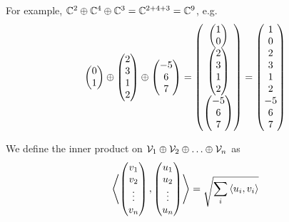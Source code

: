 For example, $\mathbb{C}^2 \oplus \mathbb{C}^4 \oplus \mathbb{C}^3 = \mathbb{C}^{2+4+3} = \mathbb{C}^9$, e.g.
\[\begin{pmatrix}0\\1\end{pmatrix}\oplus\begin{pmatrix}2\\3\\1\\2\\\end{pmatrix}\oplus\begin{pmatrix}-5\\6\\7\end{pmatrix} = \begin{pmatrix}\begin{pmatrix}1\\0\end{pmatrix}\\\begin{pmatrix}2\\3\\1\\2\\\end{pmatrix}\\\begin{pmatrix}-5\\6\\7\end{pmatrix}\end{pmatrix} = \begin{pmatrix}1\\0\\2\\3\\1\\2\\-5\\6\\7\end{pmatrix}\]

\begin{definition}
    We define the inner product on $\vecspace{V}_1 \directsum \vecspace{V}_2 \directsum \dots \directsum \vecspace{V}_n$ as
    \[\left\langle \begin{pmatrix}v_1\\v_2\\\vdots\\v_n\end{pmatrix}, \begin{pmatrix}u_1\\u_2\\\vdots\\u_n\end{pmatrix}\right\rangle = \sqrt{\sum_{i}\left\langle u_i, v_i\right\rangle}\]
\end{definition}

